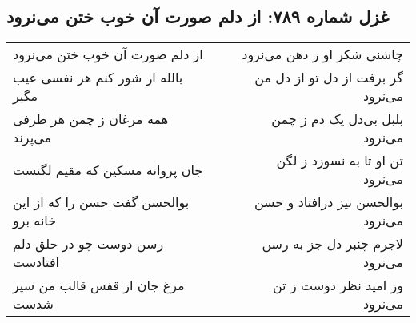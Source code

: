 \begin{center}
\section*{غزل شماره ۷۸۹: از دلم صورت آن خوب ختن می‌نرود}
\label{sec:0789}
\begin{longtable}{l p{0.5cm} r}
از دلم صورت آن خوب ختن می‌نرود
&&
چاشنی شکر او ز دهن می‌نرود
\\
بالله ار شور کنم هر نفسی عیب مگیر
&&
گر برفت از دل تو از دل من می‌نرود
\\
همه مرغان ز چمن هر طرفی می‌پرند
&&
بلبل بی‌دل یک دم ز چمن می‌نرود
\\
جان پروانه مسکین که مقیم لگنست
&&
تن او تا به نسوزد ز لگن می‌نرود
\\
بوالحسن گفت حسن را که از این خانه برو
&&
بوالحسن نیز درافتاد و حسن می‌نرود
\\
رسن دوست چو در حلق دلم افتادست
&&
لاجرم چنبر دل جز به رسن می‌نرود
\\
مرغ جان از قفس قالب من سیر شدست
&&
وز امید نظر دوست ز تن می‌نرود
\\
\end{longtable}
\end{center}
